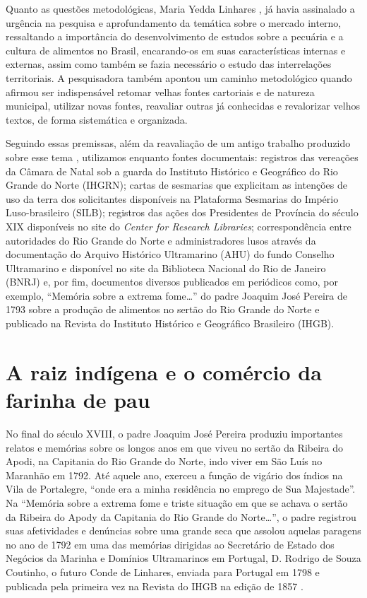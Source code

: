 \begin{refsection}
Quanto as questões metodológicas, Maria Yedda Linhares \citeyear{Linhares1979historia}, já havia assinalado a urgência na pesquisa e aprofundamento da temática sobre o mercado interno, ressaltando a importância do desenvolvimento de estudos sobre a pecuária e a cultura de alimentos no Brasil, encarando-os em suas características internas e externas, assim como também se fazia necessário o estudo das interrelações territoriais. A pesquisadora também apontou um caminho metodológico quando afirmou ser indispensável retomar velhas fontes cartoriais e de natureza municipal, utilizar novas fontes, reavaliar outras já conhecidas e revalorizar velhos textos, de forma sistemática e organizada.  

Seguindo essas premissas, além da reavaliação de um antigo trabalho produzido sobre esse tema \cite{Dias2007carne}, utilizamos enquanto fontes documentais: registros das vereações da Câmara de Natal sob a guarda do Instituto Histórico e Geográfico do Rio Grande do Norte (IHGRN); cartas de sesmarias que explicitam as intenções de uso da terra dos solicitantes disponíveis na Plataforma Sesmarias do Império Luso-brasileiro (SILB); registros das ações dos Presidentes de Província do século XIX disponíveis no site do \textit{Center for Research Libraries}; correspondência entre autoridades do Rio Grande do Norte e administradores lusos através da documentação do Arquivo Histórico Ultramarino (AHU) do fundo Conselho Ultramarino e disponível no site da Biblioteca Nacional do Rio de Janeiro (BNRJ) e, por fim, documentos diversos publicados em periódicos como, por exemplo, “Memória sobre a extrema fome\dots” do padre Joaquim José Pereira de 1793 sobre a produção de alimentos no sertão do Rio Grande do Norte e publicado na Revista do Instituto Histórico e Geográfico Brasileiro (IHGB).

\section{A raiz indígena e o comércio da farinha de pau}

No final do século XVIII, o padre Joaquim José Pereira produziu importantes relatos e memórias  sobre os longos anos em que viveu no sertão da Ribeira do Apodi, na Capitania do Rio Grande do Norte, indo viver em São Luís no Maranhão em 1792. Até aquele ano, exerceu a função de vigário dos índios na Vila de Portalegre, “onde era a minha residência no emprego de Sua Majestade”. Na “Memória sobre a extrema fome e triste situação em que se achava o sertão da Ribeira do Apody da Capitania do Rio Grande do Norte\dots”, o padre registrou suas afetividades e denúncias sobre uma grande seca que assolou aquelas paragens no ano de 1792 em uma das memórias dirigidas ao Secretário de Estado dos Negócios da Marinha e Domínios Ultramarinos em Portugal, D. Rodrigo de Souza Coutinho, o futuro Conde de Linhares, enviada para Portugal em 1798 e publicada pela primeira vez na Revista do IHGB na edição de 1857 \cite{Pereira1973memoria}. 


\end{refsection}
